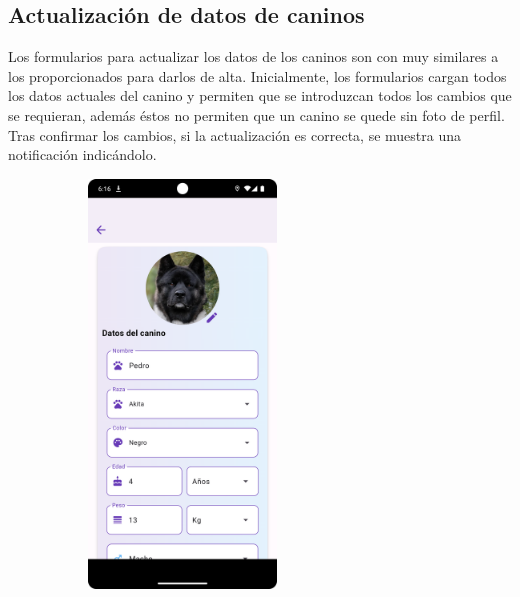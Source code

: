 \documentclass[a4paper, 12pt]{article}
\begin{document}
\newpage
\subsection*{Actualización de datos de caninos}

Los formularios para actualizar los datos de los caninos son con muy similares a los proporcionados para darlos de alta. Inicialmente, los formularios cargan todos los datos actuales del canino y permiten que se introduzcan todos los cambios que se requieran, además éstos no permiten que un canino se quede sin foto de perfil. Tras confirmar los cambios, si la actualización es correcta, se muestra una notificación indicándolo.

\begin{figure}[H]
   	\begin{subfigure}{0.48\textwidth}
		\begin{center}
			{\includegraphics[width=5cm]{app/DogUpdate.png}\par}
		\end{center}  
	\end{subfigure}\hfill
   	\begin{subfigure}{0.48\textwidth}
		\begin{center}

\end{center}
\end{subfigure}
\end{figure}
\end{document}
